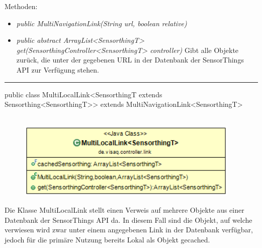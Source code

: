 Methoden:
\begin{itemize}
    \item \emph{public MultiNavigationLink(String url, boolean relative)}
    \relativeDescription
    \item \emph{public abstract ArrayList<SensorthingT> get(SensorthingController<SensorthingT> controller)}
    Gibt alle Objekte zurück, die unter der gegebenen URL in der Datenbank der \gls{SensorThings API} zur Verfügung stehen.
\end{itemize}
\clearpage %
\rule{\textwidth}{0.4pt}
public class MultiLocalLink<SensorthingT extends Sensorthing<SensorthingT>> extends MultiNavigationLink<SensorthingT>
\\\\
\begin{minipage}{0.5\textwidth}
    \begin{figure}[H]
        {\centering\includegraphics[width=0.95\textwidth]{media/backend/controller/classes/MultiLocalLink.png}}
    \end{figure}
    \end{minipage} \hfill
\begin{minipage}{0.5\textwidth}
    Die Klasse MultiLocalLink stellt einen Verweis auf mehrere Objekte aus einer Datenbank der \gls{SensorThings API} da.
    In diesem Fall sind die Objekt, auf welche verwiesen wird zwar unter einem angegebenen Link in der Datenbank verfügbar, jedoch für die primäre Nutzung bereits Lokal als Objekt gecached.
\end{minipage}

